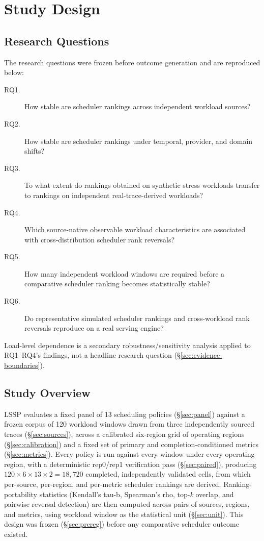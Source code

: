 \documentclass[sn-basic,Numbered,pdflatex]{sn-jnl}
\begin{document}
\section{Study Design}
\label{sec:study-design}

\subsection{Research Questions}
\label{sec:rq}

The research questions were frozen before outcome generation and are reproduced below:

\begin{description}
  \item[RQ1.] How stable are scheduler rankings across independent
    workload sources?
  \item[RQ2.] How stable are scheduler rankings under temporal, provider,
    and domain shifts?
  \item[RQ3.] To what extent do rankings obtained on synthetic stress
    workloads transfer to rankings on independent real-trace-derived
    workloads?
  \item[RQ4.] Which source-native observable workload characteristics are
    associated with cross-distribution scheduler rank reversals?
  \item[RQ5.] How many independent workload windows are required before a
    comparative scheduler ranking becomes statistically stable?
  \item[RQ6.] Do representative simulated scheduler rankings and
    cross-workload rank reversals reproduce on a real serving engine?
\end{description}

Load-level dependence is a secondary robustness/sensitivity analysis applied
to RQ1--RQ4's findings, not a headline research question
(\S\ref{sec:evidence-boundaries}).

\subsection{Study Overview}
\label{sec:overview}

LSSP evaluates a fixed panel of 13 scheduling policies (\S\ref{sec:panel})
against a frozen corpus of 120 workload windows drawn from three
independently sourced traces (\S\ref{sec:sources}), across a calibrated
six-region grid of operating regions (\S\ref{sec:calibration}) and a fixed
set of primary and completion-conditioned metrics (\S\ref{sec:metrics}).
Every policy is run against every window under every operating region,
with a deterministic rep0/rep1 verification pass (\S\ref{sec:paired}),
producing $120 \times 6 \times 13 \times 2 = 18{,}720$ completed,
independently validated cells, from which per-source, per-region, and
per-metric scheduler rankings are derived. Ranking-portability statistics (Kendall's tau-b, Spearman's
rho, top-\emph{k} overlap, and pairwise reversal detection) are then
computed across pairs of sources, regions, and metrics, using workload
window as the statistical unit (\S\ref{sec:unit}). This design was frozen
(\S\ref{sec:prereg}) before any comparative scheduler outcome existed.
\end{document}
